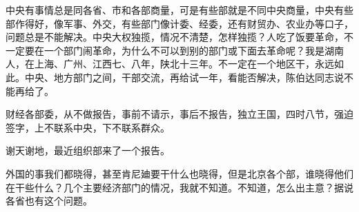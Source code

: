 中央有事情总是同各省、市和各部商量，可是有些部就是不同中央商量，中央有些部作得好，像军事、外交，有些部门像计委、经委，还有财贸办、农业办等口子，问题总是不能解决。中央大权独揽，情况不清楚，怎样独揽？人吃了饭要革命，不一定要在一个部门闹革命，为什么不可以到别的部门或下面去革命呢？我是湖南人，在上海、广州、江西七、八年，陕北十三年。不一定在一个地区干，永远如此。中央、地方部门之间，干部交流，再给试一年，看能否解决，陈伯达同志说不能再给了。

财经各部委，从不做报告，事前不请示，事后不报告，独立王国，四时八节，强迫签字，上不联系中央，下不联系群众。

谢天谢地，最近组织部来了一个报告。

外国的事我们都晓得，甚至肯尼廸要干什么也晓得，但是北京各个部，谁晓得他们在干些什么？几个主要经济部门的情况，我就不知道。不知道，怎么出主意？据说各省也有这个问题。

